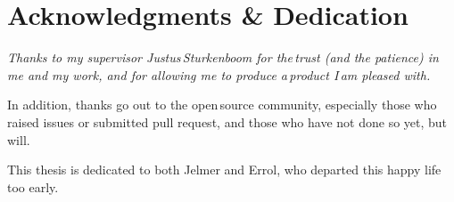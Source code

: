 
\begingroup
  \let\clearpage\relax
  \let\cleardoublepage\relax
  \chapter*{Acknowledgments \& Dedication}

  \itshape
  Thanks to my supervisor Justus\,Sturkenboom for the\,trust (and
    the patience) in me and my work, and for allowing me to produce
    a\,product I\,am pleased with.

  \medskip
  \noindent In addition, thanks go out to the open\,source community,
    especially those who raised issues or submitted pull request, and those
    who have not done so yet, but will.

  \medskip
  \noindent This thesis is dedicated to both Jelmer and Errol, who departed
    this happy life too early.
\endgroup
